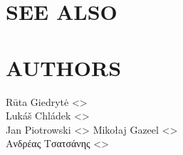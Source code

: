 \documentclass[a4paper,english]{article}
\begin{document}
\begin{adjustwidth}{18pt}{0pt}
    \section{SEE ALSO}



    \section{AUTHORS}
    Rūta Giedrytė <>\\[0.1cm]\MANbr
    Lukáš Chládek <>\\[0.1cm]\MANbr
    Jan Piotrowski <>
    Mikołaj Gazeel <>\\[0.1cm]\MANbr
    Ανδρέας Τσατσάνης <>\\[0.1cm]\MANbr
\end{adjustwidth}
\end{document}
